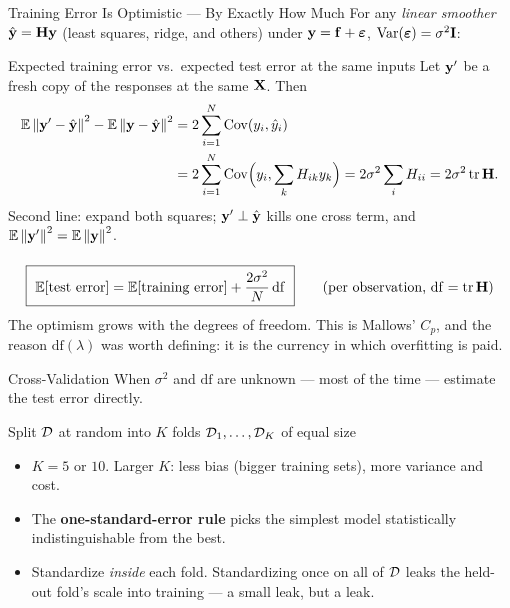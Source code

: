 \documentclass[11pt,aspectratio=169]{beamer}
\begin{document}
\begin{frame}{Training Error Is Optimistic --- By Exactly How Much}\footnotesize\vspace{-4pt}
For any \emph{linear smoother} $\hat{\mathbf{y}}=\mathbf{H}\mathbf{y}$ (least squares, ridge, and others) under $\mathbf{y}=\mathbf{f}+\boldsymbol{\varepsilon}$, $\operatorname{Var}(\boldsymbol{\varepsilon})=\sigma^2\mathbf{I}$:
\begin{derivation}{Expected training error vs.\ expected test error at the same inputs}
Let $\mathbf{y}'$ be a fresh copy of the responses at the same $\mathbf{X}$. Then
\begin{align*}
\mathbb{E}\left\lVert \mathbf{y}'-\hat{\mathbf{y}} \right\rVert^2-\mathbb{E}\left\lVert \mathbf{y}-\hat{\mathbf{y}} \right\rVert^2
&=2\sum_{i=1}^N\operatorname{Cov}(y_i,\hat y_i)\\
&=2\sum_{i=1}^N\operatorname{Cov}\Bigl(y_i,\sum_kH_{ik}y_k\Bigr)=2\sigma^2\sum_iH_{ii}=2\sigma^2\operatorname{tr}\mathbf{H} .
\end{align*}
Second line: expand both squares; $\mathbf{y}'\perp\hat{\mathbf{y}}$ kills one cross term, and $\mathbb{E}\left\lVert \mathbf{y}' \right\rVert^2=\mathbb{E}\left\lVert \mathbf{y} \right\rVert^2$.
\begin{align*}
\end{align*}
\end{derivation}
\[
\boxed{\ \mathbb{E}[\text{test error}]=\mathbb{E}[\text{training error}]+\frac{2\sigma^2}{N}\,\mathrm{df}\ }
\qquad\text{(per observation, }\mathrm{df}=\operatorname{tr}\mathbf{H}\text{)}
\]
The optimism grows with the degrees of freedom. This is Mallows' $C_p$, and the reason $\mathrm{df}(\lambda)$ was
worth defining: it is the currency in which overfitting is paid.
\end{frame}

\begin{frame}{Cross-Validation}\small
When $\sigma^2$ and $\mathrm{df}$ are unknown --- most of the time --- estimate the test error directly.
\begin{algorithm}[H]
\SetAlgoLined
{}
Split $\mathcal{D}$ at random into $K$ folds $\mathcal{D}_1,\dots,\mathcal{D}_K$ of equal size\;
\end{algorithm}
\begin{itemize}
  \item $K=5$ or $10$. Larger $K$: less bias (bigger training sets), more variance and cost.
  \item The \textbf{one-standard-error rule} picks the simplest model statistically indistinguishable from the best.
  \item Standardize \emph{inside} each fold. Standardizing once on all of $\mathcal{D}$ leaks the held-out fold's scale
        into training --- a small leak, but a leak.
\end{itemize}
\end{frame}
\end{document}
